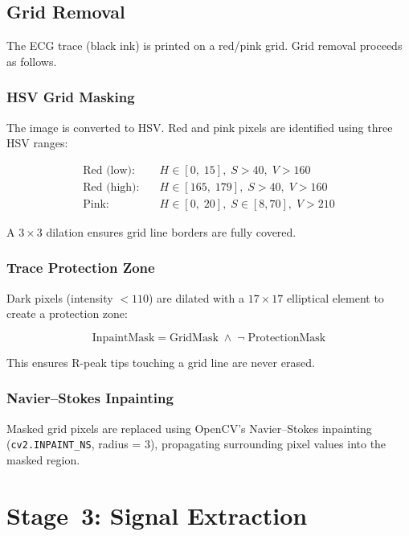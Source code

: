 \documentclass[conference]{IEEEtran}
\begin{document}
\subsection{Grid Removal}

The ECG trace (black ink) is printed on a red/pink grid. Grid removal
proceeds as follows.

\subsubsection{HSV Grid Masking}

The image is converted to HSV. Red and pink pixels are identified using
three HSV ranges:

\begin{align}
  \text{Red (low):} \quad  &H \in [0,\; 15],\; S > 40,\; V > 160 \\
  \text{Red (high):} \quad &H \in [165,\; 179],\; S > 40,\; V > 160 \\
  \text{Pink:} \quad       &H \in [0,\; 20],\; S \in [8, 70],\; V > 210
\end{align}

A $3 \times 3$ dilation ensures grid line borders are fully covered.

\subsubsection{Trace Protection Zone}

Dark pixels (intensity $< 110$) are dilated with a $17 \times 17$ elliptical
element to create a protection zone:

\begin{equation}
  \text{InpaintMask} = \text{GridMask} \;\land\; \lnot\;\text{ProtectionMask}
\end{equation}

This ensures R-peak tips touching a grid line are never erased.

\subsubsection{Navier--Stokes Inpainting}

Masked grid pixels are replaced using OpenCV's Navier--Stokes inpainting
(\texttt{cv2.INPAINT\_NS}, radius = 3), propagating surrounding pixel values
into the masked region.

\section{Stage~3: Signal Extraction}
\end{document}
